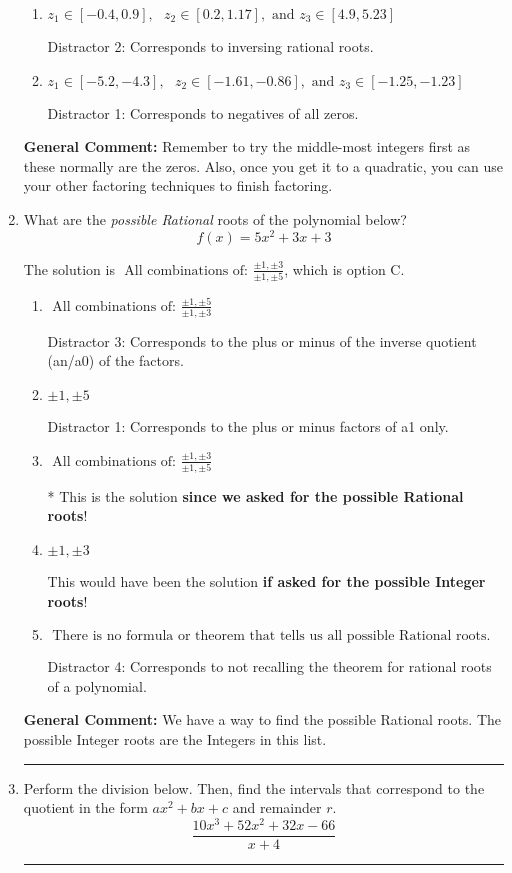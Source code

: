 \documentclass{extbook}[14pt]
\newcommand{\litem}[1]{\item #1

\rule{\textwidth}{0.4pt}}
\begin{document}
\begin{enumerate}
{\begin{enumerate}[label=\Alph*.]
 Distractor 4: Corresponds to moving factors from one rational to another.
\item \( z_1 \in [-0.4, 0.9], \text{   }  z_2 \in [0.2, 1.17], \text{   and   } z_3 \in [4.9, 5.23] \)

 Distractor 2: Corresponds to inversing rational roots.
\item \( z_1 \in [-5.2, -4.3], \text{   }  z_2 \in [-1.61, -0.86], \text{   and   } z_3 \in [-1.25, -1.23] \)

 Distractor 1: Corresponds to negatives of all zeros.
\end{enumerate}

\textbf{General Comment:} Remember to try the middle-most integers first as these normally are the zeros. Also, once you get it to a quadratic, you can use your other factoring techniques to finish factoring.
}
\litem{
What are the \textit{possible Rational} roots of the polynomial below?
\[ f(x) = 5x^{2} +3 x + 3 \]

The solution is \( \text{ All combinations of: }\frac{\pm 1,\pm 3}{\pm 1,\pm 5} \), which is option C.\begin{enumerate}[label=\Alph*.]
\item \( \text{ All combinations of: }\frac{\pm 1,\pm 5}{\pm 1,\pm 3} \)

 Distractor 3: Corresponds to the plus or minus of the inverse quotient (an/a0) of the factors. 
\item \( \pm 1,\pm 5 \)

 Distractor 1: Corresponds to the plus or minus factors of a1 only.
\item \( \text{ All combinations of: }\frac{\pm 1,\pm 3}{\pm 1,\pm 5} \)

* This is the solution \textbf{since we asked for the possible Rational roots}!
\item \( \pm 1,\pm 3 \)

This would have been the solution \textbf{if asked for the possible Integer roots}!
\item \( \text{ There is no formula or theorem that tells us all possible Rational roots.} \)

 Distractor 4: Corresponds to not recalling the theorem for rational roots of a polynomial.
\end{enumerate}

\textbf{General Comment:} We have a way to find the possible Rational roots. The possible Integer roots are the Integers in this list.
}
\litem{
Perform the division below. Then, find the intervals that correspond to the quotient in the form $ax^2+bx+c$ and remainder $r$.
\[ \frac{10x^{3} +52 x^{2} +32 x -66}{x + 4} \]

}
\end{enumerate}
\end{document}
